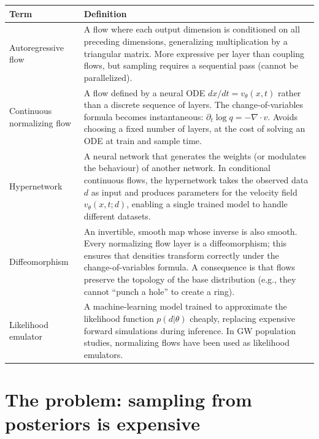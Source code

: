 \documentclass[11pt,letterpaper]{article}
\begin{document}
\begin{table}[H]
\centering
\small
\begin{tabular}{@{}p{}p{}@{}}
\toprule
\textbf{Term} & \textbf{Definition} \\
\midrule
Autoregressive flow &
  A flow where each output dimension is conditioned on all preceding
  dimensions, generalizing multiplication by a triangular matrix.
  More expressive per layer than coupling flows, but sampling requires
  a sequential pass (cannot be parallelized). \\[4pt]
Continuous normalizing flow &
  A flow defined by a neural ODE $dx/dt = v_\theta(x,t)$ rather than
  a discrete sequence of layers.
  The change-of-variables formula becomes instantaneous:
  $\partial_t \log q = -\nabla \cdot v$.
  Avoids choosing a fixed number of layers, at the cost of solving an
  ODE at train and sample time. \\[4pt]
Hypernetwork &
  A neural network that generates the weights (or modulates the
  behaviour) of another network.
  In conditional continuous flows, the hypernetwork takes the observed
  data $d$ as input and produces parameters for the velocity field
  $v_\theta(x,t; d)$, enabling a single trained model to handle
  different datasets. \\[4pt]
Diffeomorphism &
  An invertible, smooth map whose inverse is also smooth.
  Every normalizing flow layer is a diffeomorphism; this ensures that
  densities transform correctly under the change-of-variables formula.
  A consequence is that flows preserve the topology of the base
  distribution (e.g., they cannot ``punch a hole'' to create a ring). \\[4pt]
Likelihood emulator &
  A machine-learning model trained to approximate the likelihood
  function $p(d|\theta)$ cheaply, replacing expensive forward
  simulations during inference.
  In GW population studies, normalizing flows have been used as
  likelihood emulators. \\
\bottomrule
\end{tabular}
\end{table}

\newpage
\tableofcontents
\newpage

\section{The problem: sampling from posteriors is expensive}
\label{sec:problem}
\end{document}

